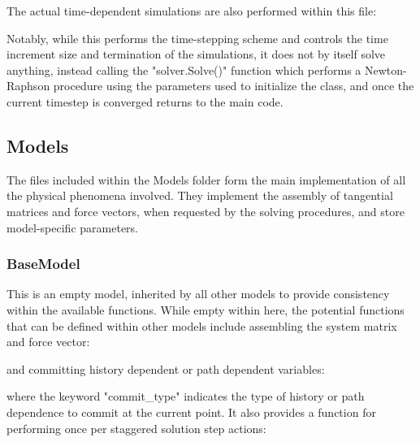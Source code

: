 \documentclass[3p]{elsarticle} %
\begin{document}
The actual time-dependent simulations are also performed within this file:


Notably, while this performs the time-stepping scheme and controls the time increment size and termination of the simulations, it does not by itself solve anything, instead calling the "solver.Solve()" function which performs a Newton-Raphson procedure using the parameters used to initialize the class, and once the current timestep is converged returns to the main code.

\subsection{Models}
The files included within the Models folder form the main implementation of all the physical phenomena involved. They implement the assembly of tangential matrices and force vectors, when requested by the solving procedures, and store model-specific parameters. 

\subsubsection{BaseModel}
This is an empty model, inherited by all other models to provide consistency within the available functions. While empty within here, the potential functions that can be defined within other models include assembling the system matrix and force vector:

and committing history dependent or path dependent variables:

where the keyword "commit{\_}type" indicates the type of history or path dependence to commit at the current point. 
It also provides a function for performing once per staggered solution step actions:

\end{document}
